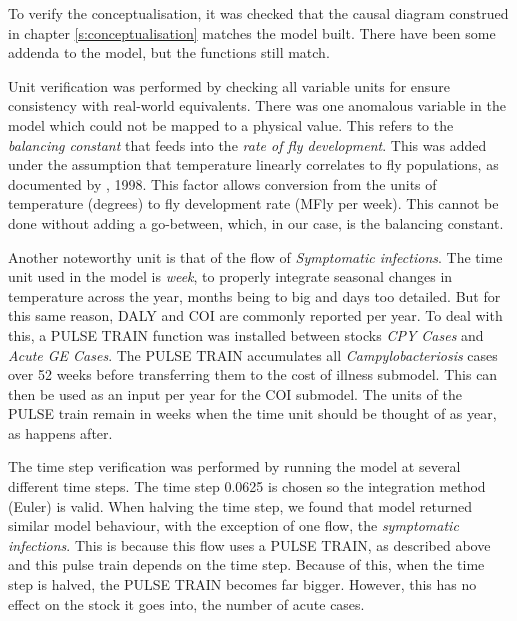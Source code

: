     
To verify the conceptualisation, it was checked that the causal diagram construed in chapter \ref{s:conceptualisation} matches the model built. There have been some addenda to the model, but the functions still match.  
    
Unit verification was performed by checking all variable units for ensure consistency with real-world equivalents. There was one anomalous variable in the model which could not be mapped to a physical value. This refers to the \textit{balancing constant} that feeds into the \textit{rate of fly development}. This was added under the assumption that temperature linearly correlates to fly populations, as documented by \citeauthor{blanckenhorn_adaptive_1998}, 1998. This factor allows conversion from the units of temperature (degrees) to fly development rate (MFly per week). This cannot be done without adding a go-between, which, in our case, is the balancing constant. %

Another noteworthy unit is that of the flow of \textit{Symptomatic infections}. The time unit used in the model is \textit{week}, to properly integrate seasonal changes in temperature across the year, months being to big and days too detailed. But for this same reason, DALY and COI are commonly reported per year. To deal with this, a PULSE TRAIN function was installed between stocks \textit{CPY Cases} and \textit{Acute GE Cases}. The PULSE TRAIN accumulates all \textit{Campylobacteriosis} cases over 52 weeks before transferring them to the cost of illness submodel. This can then be used as an input per year for the COI submodel. The units of the PULSE train remain in weeks when the time unit should be thought of as year, as happens after. 
    
The time step verification was performed by running the model at several different time steps. The time step 0.0625 is chosen so the integration method (Euler) is valid. When halving the time step, we found that model returned similar model behaviour, with the exception of one flow, the \textit{symptomatic infections}. This is because this flow uses a PULSE TRAIN, as described above and this pulse train depends on the time step. Because of this, when the time step is halved, the PULSE TRAIN becomes far bigger. However, this has no effect on the stock it goes into, the number of acute cases. %


